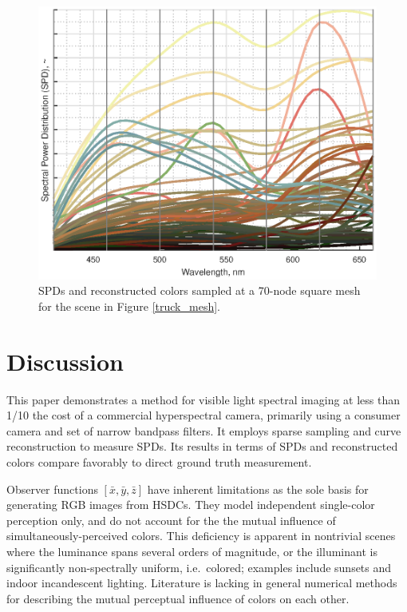\documentclass[twocolumn,10pt]{asme2ej}
\newcommand{\id}{\hspace{6 mm}}
\begin{document}
\begin{figure}[H]
\begin{centering}
  \includegraphics[height=0.6\linewidth]{truck_SPDs.eps}
  \caption{SPDs and reconstructed colors sampled at a 70-node square mesh for the scene in Figure \ref{truck_mesh}.}
  \label{path_SPDs}
  \end{centering}
\end{figure}


\clearpage
\twocolumn

\section{Discussion}

This paper demonstrates a method for visible light spectral imaging at less than 1/10 the cost of a commercial hyperspectral camera, primarily using a consumer camera and set of narrow bandpass filters. It employs sparse sampling and curve reconstruction to measure SPDs. Its results in terms of SPDs and reconstructed colors compare favorably to direct ground truth measurement.

\id Observer functions $[ \bar{x}, \bar{y}, \bar{z} ]$ have inherent limitations as the sole basis for generating RGB images from HSDCs. They model independent single-color perception only, and do not account for the the mutual influence of simultaneously-perceived colors. This deficiency is apparent in nontrivial scenes where the luminance spans several orders of magnitude, or the illuminant is significantly non-spectrally uniform, i.e.\ colored; examples include sunsets and indoor incandescent lighting. Literature is lacking in general numerical methods for describing the mutual perceptual influence of colors on each other.
\end{document}
